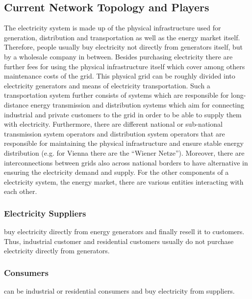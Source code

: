\documentclass[runningheads]{llncs}
\begin{document}
\subsection{Current Network Topology and Players}
The electricity system is made up of the physical infrastructure used for generation, distribution and transportation as well as the energy market itself. Therefore, people usually buy electricity not directly from generators itself, but by a wholesale company in between. Besides purchasing electricity there are further fees for using the physical infrastructure itself which cover among others maintenance costs of the grid.
This physical grid can be roughly divided into electricity generators and means of electricity transportation. Such a transportation system further consists of systems which are responsible for long-distance energy transmission and distribution systems which aim for connecting industrial and private customers to the grid in order to be able to supply them with electricity. Furthermore, there are different national or sub-national transmission system operators and distribution system operators that are responsible for maintaining the physical infrastructure and ensure stable energy distribution (e.g. for Vienna there are the “Wiener Netze”). Moreover, there are interconnections between grids also across national borders to have alternative in ensuring the electricity demand and supply. \cite{eu_energy_market}
For the other components of a electricity system, the energy market, there are various entities interacting with each other.

\subsubsection{Electricity Suppliers} buy electricity directly from energy generators and finally resell it to customers. Thus, industrial customer and residential customers usually do not purchase electricity directly from generators.

\subsubsection{Consumers} can be industrial or residential consumers and buy electricity from suppliers.
\end{document}
